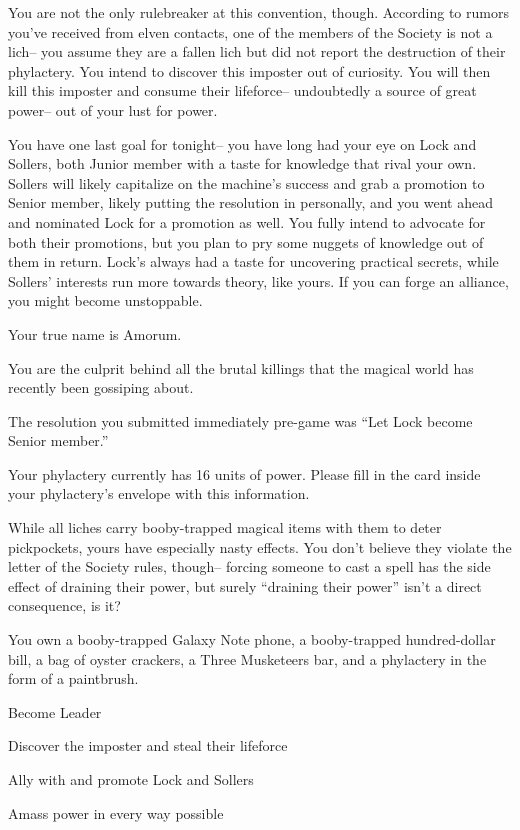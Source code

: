\documentclass[char]{Sel}
\begin{document}
You are not the only rulebreaker at this convention, though. According to rumors you've received from elven contacts, one of the members of the Society is not a lich-- you assume they are a fallen lich but did not report the destruction of their phylactery. You intend to discover this imposter out of curiosity. You will then kill this imposter and consume their lifeforce-- undoubtedly a source of great power-- out of your lust for power.

You have one last goal for tonight-- you have long had your eye on Lock and Sollers, both Junior member with a taste for knowledge that rival your own. Sollers will likely capitalize on the machine's success and grab a promotion to Senior member, likely putting the resolution in personally, and you went ahead and nominated Lock for a promotion as well. You fully intend to advocate for both their promotions, but you plan to pry some nuggets of knowledge out of them in return. Lock's always had a taste for uncovering practical secrets, while Sollers' interests run more towards theory, like yours. If you can forge an alliance, you might become unstoppable.

\begin{itemz}[Notes]
  \item Your true name is Amorum.
    \item You are the culprit behind all the brutal killings that the magical world has recently been gossiping about.
  \item The resolution you submitted immediately pre-game was ``Let Lock become Senior member.''
      \item Your phylactery currently has 16 units of power. Please fill in the card inside your phylactery's envelope with this information.
   \item While all liches carry booby-trapped magical items with them to deter pickpockets, yours have especially nasty effects. You don't believe they violate the letter of the Society rules, though-- forcing someone to cast a spell has the side effect of draining their power, but surely ``draining their power'' isn't a direct consequence, is it?
\item You own a booby-trapped Galaxy Note phone, a booby-trapped hundred-dollar bill, a bag of oyster crackers, a Three Musketeers bar, and a phylactery in the form of a paintbrush.
    \end{itemz}
   
    
 \begin{itemz}[Goals]
\item Become Leader
\item Discover the imposter and steal their lifeforce
\item Ally with and promote Lock and Sollers
\item Amass power in every way possible
\end{itemz}
\end{document}
